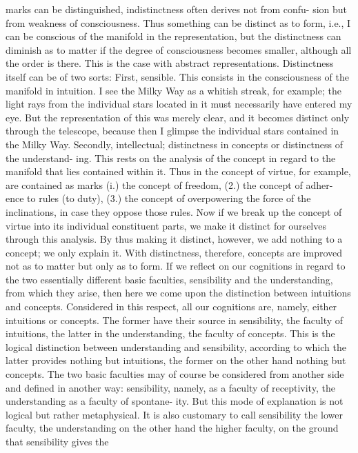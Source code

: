 marks can be distinguished, indistinctness often derives not from confu-
sion but from weakness of consciousness. Thus something can be distinct as
to form, i.e., I can be conscious of the manifold in the representation, but
the distinctness can diminish as to matter if the degree of consciousness
becomes smaller, although all the order is there. This is the case with
abstract representations.
Distinctness itself can be of two sorts:
First, sensible. This consists in the consciousness of the manifold in
intuition. I see the Milky Way as a whitish streak, for example; the light
rays from the individual stars located in it must necessarily have entered
my eye. But the representation of this was merely clear, and it becomes
distinct only through the telescope, because then I glimpse the individual
stars contained in the Milky Way.
Secondly, intellectual; distinctness in concepts or distinctness of the understand-
ing. This rests on the analysis of the concept in regard to the manifold that
lies contained within it. Thus in the concept of virtue, for example, are
contained as marks (i.) the concept of freedom, (2.) the concept of adher-
ence to rules (to duty), (3.) the concept of overpowering the force of the
inclinations, in case they oppose those rules. Now if we break up the
concept of virtue into its individual constituent parts, we make it distinct
for ourselves through this analysis. By thus making it distinct, however, we
add nothing to a concept; we only explain it. With distinctness, therefore,
concepts are improved not as to matter but only as to form.
If we reflect on our cognitions in regard to the two essentially different
basic faculties, sensibility and the understanding, from which they arise,
then here we come upon the distinction between intuitions and concepts.
Considered in this respect, all our cognitions are, namely, either intuitions
or concepts. The former have their source in sensibility, the faculty of
intuitions, the latter in the understanding, the faculty of concepts. This is
the logical distinction between understanding and sensibility, according to
which the latter provides nothing but intuitions, the former on the other
hand nothing but concepts. The two basic faculties may of course be
considered from another side and defined in another way: sensibility,
namely, as a faculty of receptivity, the understanding as a faculty of spontane-
ity. But this mode of explanation is not logical but rather metaphysical. It is
also customary to call sensibility the lower faculty, the understanding on
the other hand the higher faculty, on the ground that sensibility gives the
